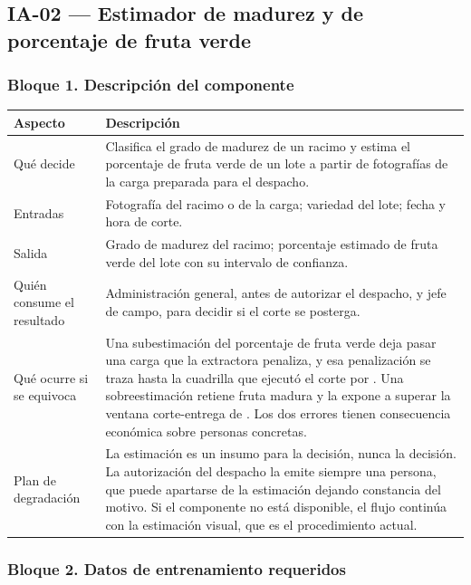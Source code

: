 \subsection{IA-02 --- Estimador de madurez y de porcentaje de fruta verde}

\subsubsection*{Bloque 1. Descripción del componente}

\begin{table}[H]
\centering\footnotesize
\begin{tabular}{|L{3.6cm}|L{11.8cm}|}
\hline
{}\textbf{Aspecto} & \textbf{Descripción}\\ \hline
Qué decide & Clasifica el grado de madurez de un racimo y estima el porcentaje de fruta verde de un lote a partir de fotografías de la carga preparada para el despacho.\\ \hline
Entradas & Fotografía del racimo o de la carga; variedad del lote; fecha y hora de corte.\\ \hline
Salida & Grado de madurez del racimo; porcentaje estimado de fruta verde del lote con su intervalo de confianza.\\ \hline
Quién consume el resultado & Administración general, antes de autorizar el despacho, y jefe de campo, para decidir si el corte se posterga.\\ \hline
Qué ocurre si se equivoca & Una subestimación del porcentaje de fruta verde deja pasar una carga que la extractora penaliza, y esa penalización se traza hasta la cuadrilla que ejecutó el corte por . Una sobreestimación retiene fruta madura y la expone a superar la ventana corte-entrega de . Los dos errores tienen consecuencia económica sobre personas concretas.\\ \hline
Plan de degradación & La estimación es un insumo para la decisión, nunca la decisión. La autorización del despacho la emite siempre una persona, que puede apartarse de la estimación dejando constancia del motivo. Si el componente no está disponible, el flujo continúa con la estimación visual, que es el procedimiento actual.\\ \hline
\end{tabular}
\end{table}

\subsubsection*{Bloque 2. Datos de entrenamiento requeridos}

